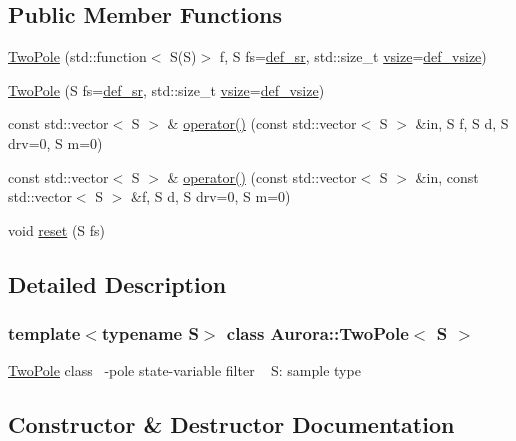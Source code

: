 \subsection*{Public Member Functions}
\begin{DoxyCompactItemize}
\item 
\hyperlink{class_aurora_1_1_two_pole_a0545f0b722b88873bb798b6c0f2112e8}{Two\+Pole} (std\+::function$<$ S(S)$>$ f, S fs=\hyperlink{namespace_aurora_ad49263d809bea98dd422e95bc91bc03e}{def\+\_\+sr}, std\+::size\+\_\+t \hyperlink{class_aurora_1_1_snd_base_af9e21aaf411b17f7a8221c991ce5d291}{vsize}=\hyperlink{namespace_aurora_afaaddf667a06e7ce23c667a8b7295263}{def\+\_\+vsize})
\item 
\hyperlink{class_aurora_1_1_two_pole_afb7af09d7f8a80b18d875e78f4bcb419}{Two\+Pole} (S fs=\hyperlink{namespace_aurora_ad49263d809bea98dd422e95bc91bc03e}{def\+\_\+sr}, std\+::size\+\_\+t \hyperlink{class_aurora_1_1_snd_base_af9e21aaf411b17f7a8221c991ce5d291}{vsize}=\hyperlink{namespace_aurora_afaaddf667a06e7ce23c667a8b7295263}{def\+\_\+vsize})
\item 
const std\+::vector$<$ S $>$ \& \hyperlink{class_aurora_1_1_two_pole_a7582c69b4c221f81f25c650d9c643157}{operator()} (const std\+::vector$<$ S $>$ \&in, S f, S d, S drv=0, S m=0)
\item 
const std\+::vector$<$ S $>$ \& \hyperlink{class_aurora_1_1_two_pole_a860a443654a353bb8c40927f8a45aa46}{operator()} (const std\+::vector$<$ S $>$ \&in, const std\+::vector$<$ S $>$ \&f, S d, S drv=0, S m=0)
\item 
void \hyperlink{class_aurora_1_1_two_pole_a7fe6512d7e1e6fbc3bca49de8ecc2f95}{reset} (S fs)
\end{DoxyCompactItemize}


\subsection{Detailed Description}
\subsubsection*{template$<$typename S$>$\newline
class Aurora\+::\+Two\+Pole$<$ S $>$}

\hyperlink{class_aurora_1_1_two_pole}{Two\+Pole} class ~-\/pole state-\/variable filter ~\newline
S\+: sample type 

\subsection{Constructor \& Destructor Documentation}
\mbox{\label{class_aurora_1_1_two_pole_a0545f0b722b88873bb798b6c0f2112e8}} 
